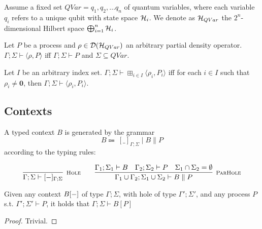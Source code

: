 \begin{definition}
  Assume a fixed set  $QVar = {q_1, q_2, \ldots q_n}$ of quantum variables, where each variable $q_i$ refers to a unique qubit with state space $\mathcal{H}_i$. We denote as $\mathcal{H}_{QVar}$ the $2^n$-dimensional Hilbert space $\bigoplus_{i=1}^n \mathcal{H}_i$.

Let $P$ be a process and $\rho \in \mathcal{D}(\mathcal{H}_{QVar})$ an arbitrary partial density operator. $\Gamma; \Sigma \vdash \langle \rho, P \rangle$ iff $\Gamma; \Sigma \vdash P$ and $\Sigma \subseteq QVar$.

  Let $I$ be an arbitrary index set. $\Gamma; \Sigma \vdash \boxplus_{i \in I} \langle \rho_i, P_i \rangle$ iff for each $i \in I$ such that $\rho_i \neq \mathbf{0}$,
  then $\Gamma; \Sigma \vdash \langle \rho_i, P_i \rangle$.
\end{definition}

%
%


\subsection*{Contexts}
A typed context $B$ is generated by the grammar
\[
B \Coloneqq \ [\_]_{\Gamma; \Sigma} \mid B \parallel P
\]
according to the typing rules:

\[
  \infer[\mbox{\footnotesize\scshape Hole}]{\Gamma; \Sigma \vdash [\blank]_{\Gamma; \Sigma}}{}
\qquad
\infer[\mbox{\footnotesize\scshape ParHole}]{\Gamma_1 \cup \Gamma_2; \Sigma_1 \cup \Sigma_2 \vdash B \parallel P}
{\Gamma_1; \Sigma_1 \vdash B & \Gamma_2; \Sigma_2 \vdash P & \Sigma_1 \cap \Sigma_2 = \emptyset}
\]


\begin{theorem}
	Given any context $B[{-}]$ of type $\Gamma; \Sigma$, with hole of type $\Gamma'; \Sigma'$, and any process $P$ s.t. $\Gamma'; \Sigma' \vdash P$, it holds that $\Gamma; \Sigma \vdash B[P]$ 
\end{theorem}
\begin{proof}
	Trivial.
\end{proof}